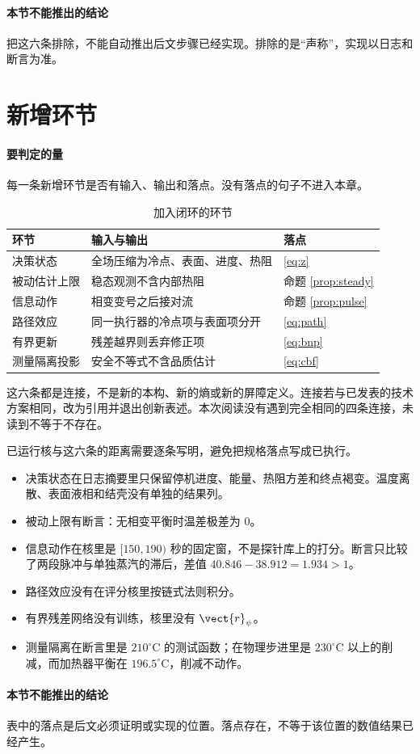 \paragraph{本节不能推出的结论}
把这六条排除，不能自动推出后文步骤已经实现。排除的是“声称”，实现以日志和断言为准。

\section{新增环节}

\paragraph{要判定的量}
每一条新增环节是否有输入、输出和落点。没有落点的句子不进入本章。

\begin{table}[ht]
\centering
\caption{加入闭环的环节}
\begin{tabularx}{\textwidth}{lXX}
\toprule
环节 & 输入与输出 & 落点 \\
\midrule
决策状态 & 全场压缩为冷点、表面、进度、热阻 & \eqref{eq:z} \\
被动估计上限 & 稳态观测不含内部热阻 & 命题 \ref{prop:steady} \\
信息动作 & 相变变号之后接对流 & 命题 \ref{prop:pulse} \\
路径效应 & 同一执行器的冷点项与表面项分开 & \eqref{eq:path} \\
有界更新 & 残差越界则丢弃修正项 & \eqref{eq:bnp} \\
测量隔离投影 & 安全不等式不含品质估计 & \eqref{eq:cbf} \\
\bottomrule
\end{tabularx}
\end{table}

这六条都是连接，不是新的本构、新的熵或新的屏障定义。连接若与已发表的技术方案相同，改为引用并退出创新表述。本次阅读没有遇到完全相同的四条连接，未读到不等于不存在。

已运行核与这六条的距离需要逐条写明，避免把规格落点写成已执行。

\begin{itemize}
\item 决策状态在日志摘要里只保留停机进度、能量、热阻方差和终点褐变。温度离散、表面液相和结壳没有单独的结果列。
\item 被动上限有断言：无相变平衡时温差极差为 0。
\item 信息动作在核里是 \([150,190)\) 秒的固定窗，不是探针库上的打分。断言只比较了两段脉冲与单独蒸汽的滞后，差值 \(40.846-38.912=1.934>1\)。
\item 路径效应没有在评分核里按链式法则积分。
\item 有界残差网络没有训练，核里没有 \(\vect{r}_{\psi}\)。
\item 测量隔离在断言里是 \(210^\circ\mathrm{C}\) 的测试函数；在物理步进里是 \(230^\circ\mathrm{C}\) 以上的削减，而加热器平衡在 \(196.5^\circ\mathrm{C}\)，削减不动作。
\end{itemize}

\paragraph{本节不能推出的结论}
表中的落点是后文必须证明或实现的位置。落点存在，不等于该位置的数值结果已经产生。
